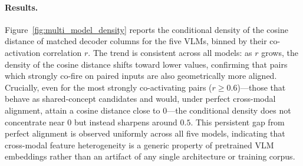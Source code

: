 \paragraph{Results.}
Figure~\ref{fig:multi_model_density} reports the conditional density of the cosine distance of matched decoder columns for the five VLMs, binned by their co-activation correlation $r$.
The trend is consistent across all models: as $r$ grows, the density of the cosine distance shifts toward lower values, confirming that pairs which strongly co-fire on paired inputs are also geometrically more aligned.
Crucially, even for the most strongly co-activating pairs ($r \ge 0.6$)---those that behave as shared-concept candidates and would, under perfect cross-modal alignment, attain a cosine distance close to $0$---the conditional density does not concentrate near $0$ but instead sharpens around $0.5$.
This persistent gap from perfect alignment is observed uniformly across all five models, indicating that cross-modal feature heterogeneity is a generic property of pretrained VLM embeddings rather than an artifact of any single architecture or training corpus.
